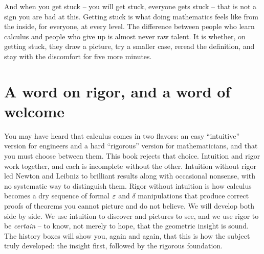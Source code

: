 \begin{recoverybox}
And when you get stuck -- you will get stuck, everyone gets stuck -- that is not a sign you are bad at
this. Getting stuck is what doing mathematics feels like from the inside, for everyone, at every
level. The difference between people who learn calculus and people who give up is almost never raw
talent. It is whether, on getting stuck, they draw a picture, try a smaller case, reread the
definition, and stay with the discomfort for five more minutes.
\end{recoverybox}

\section*{A word on rigor, and a word of welcome}

You may have heard that calculus comes in two flavors: an easy ``intuitive'' version for engineers
and a hard ``rigorous'' version for mathematicians, and that you must choose between them. This book rejects that
choice. Intuition and rigor work together, and each is incomplete
without the other. Intuition without rigor led Newton and Leibniz to brilliant results along with
occasional nonsense, with no systematic way to distinguish them. Rigor without intuition is how calculus
becomes a dry sequence of formal $\varepsilon$ and $\delta$ manipulations that produce correct proofs of theorems you cannot
picture and do not believe. We will develop both side by side. We use intuition to discover and pictures to
see, and we use rigor to be \emph{certain} -- to know, not merely to hope, that the geometric insight is
sound. The history boxes will show you, again and again, that this is how the subject
truly developed: the insight first, followed by the rigorous foundation.

